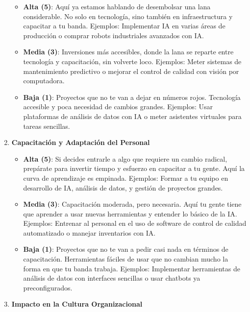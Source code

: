 \documentclass[
  letterpaper,
]{book}
\providecommand{\tightlist}{%
  \setlength{\itemsep}{0pt}\setlength{\parskip}{0pt}}\usepackage{longtable,booktabs,array}
\begin{document}
\begin{enumerate}
  \begin{itemize}
  \tightlist
  \item
    \textbf{Alta (5)}: Aquí ya estamos hablando de desembolsar una lana
    considerable. No solo en tecnología, sino también en infraestructura
    y capacitar a tu banda. Ejemplos: Implementar IA en varias áreas de
    producción o comprar robots industriales avanzados con IA.
  \item
    \textbf{Media (3)}: Inversiones más accesibles, donde la lana se
    reparte entre tecnología y capacitación, sin volverte loco.
    Ejemplos: Meter sistemas de mantenimiento predictivo o mejorar el
    control de calidad con visión por computadora.
  \item
    \textbf{Baja (1)}: Proyectos que no te van a dejar en números rojos.
    Tecnología accesible y poca necesidad de cambios grandes. Ejemplos:
    Usar plataformas de análisis de datos con IA o meter asistentes
    virtuales para tareas sencillas.
  \end{itemize}
\item
  \textbf{Capacitación y Adaptación del Personal}

  \begin{itemize}
  \tightlist
  \item
    \textbf{Alta (5)}: Si decides entrarle a algo que requiere un cambio
    radical, prepárate para invertir tiempo y esfuerzo en capacitar a tu
    gente. Aquí la curva de aprendizaje es empinada. Ejemplos: Formar a
    tu equipo en desarrollo de IA, análisis de datos, y gestión de
    proyectos grandes.
  \item
    \textbf{Media (3)}: Capacitación moderada, pero necesaria. Aquí tu
    gente tiene que aprender a usar nuevas herramientas y entender lo
    básico de la IA. Ejemplos: Entrenar al personal en el uso de
    software de control de calidad automatizado o manejar inventarios
    con IA.
  \item
    \textbf{Baja (1)}: Proyectos que no te van a pedir casi nada en
    términos de capacitación. Herramientas fáciles de usar que no
    cambian mucho la forma en que tu banda trabaja. Ejemplos:
    Implementar herramientas de análisis de datos con interfaces
    sencillas o usar chatbots ya preconfigurados.
  \end{itemize}
\item
  \textbf{Impacto en la Cultura Organizacional}


\end{enumerate}
\end{document}
